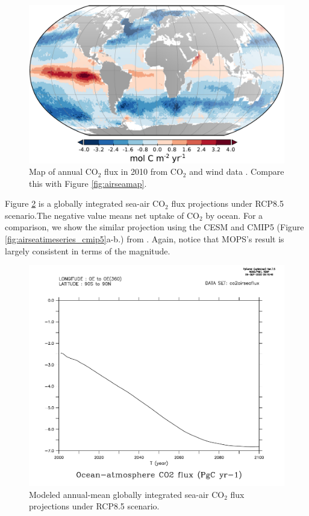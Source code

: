 \documentclass[a4paper]{article}
\begin{document}
\begin{enumerate}
\begin{figure}[h!]   %
   \centering
   \includegraphics[scale=0.1]{Woolf19_GBC_Fig1.jpg}
   \caption[]{Map of annual $\mathrm{CO_{2}}$ flux in 2010 from $\mathrm{CO_2}$ and wind data \citep{Woolf19}. Compare this with Figure \ref{fig:airseamap}.}
   \label{fig:airseamapWoolf}
\end{figure}

Figure \ref{fig:airseatimeseries} is a globally integrated sea-air $\mathrm{CO_2}$ flux projections under RCP8.5 scenario.The negative value means net uptake of $\mathrm{CO_2}$ by ocean. For a comparison, we show the similar projection using the CESM and CMIP5 (Figure \ref{fig:airseatimeseries_cmip5}a-b.) from \cite{Lovenduski16}. Again, notice that MOPS's result is largely consistent in terms of the magnitude. 

\begin{figure}[H]   %
   \centering
   \includegraphics[scale=0.35]{airseaflux_timeseries2000to2100.pdf}
   \caption[]{Modeled annual-mean globally integrated sea-air $\mathrm{CO_2}$ flux projections under RCP8.5 scenario.}
   \label{fig:airseatimeseries}
\end{figure}


\end{enumerate}
\end{document}
